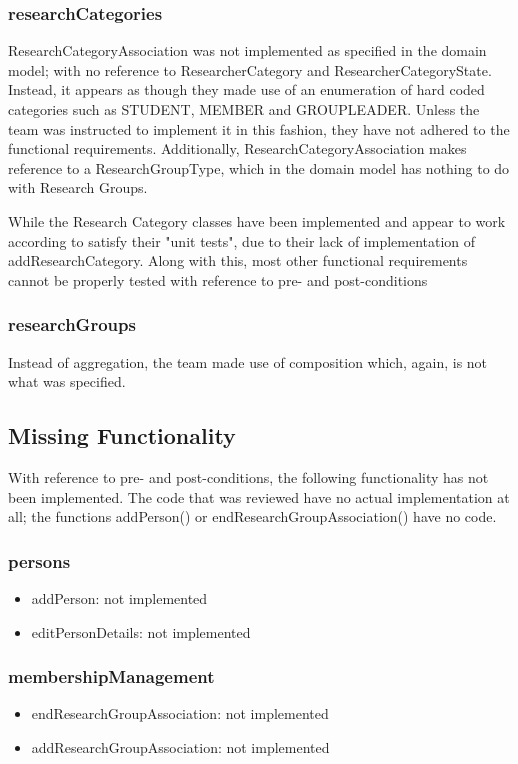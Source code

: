 \documentclass{article}
\begin{document}
	\subsubsection{researchCategories}
	ResearchCategoryAssociation was not implemented as specified in the domain model; with no reference to ResearcherCategory and ResearcherCategoryState. Instead, it appears as though they made use of an enumeration of hard coded categories such as STUDENT, MEMBER and GROUPLEADER. Unless the team was instructed to implement it in this fashion, they have not adhered to the functional requirements. Additionally, ResearchCategoryAssociation makes reference to a ResearchGroupType, which in the domain model has nothing to do with Research Groups.
	
	While the Research Category classes have been implemented and appear to work according to satisfy their "unit tests", due to their lack of implementation of addResearchCategory. Along with this, most other functional requirements cannot be properly tested with reference to pre- and post-conditions
	
	\subsubsection{researchGroups}
	
	Instead of aggregation, the team made use of composition which, again, is not what was specified.
	\newpage
	
	\subsection{Missing Functionality}
	
	With reference to pre- and post-conditions, the following functionality has not been implemented. The code that was reviewed have no actual implementation at all; the functions addPerson() or endResearchGroupAssociation() have no code.
	
	\subsubsection{persons} 
	\begin{itemize}
		\item addPerson: not implemented
		\item editPersonDetails: not implemented
	\end{itemize}
	
	\subsubsection{membershipManagement}
	\begin{itemize}
		\item endResearchGroupAssociation: not implemented
		\item addResearchGroupAssociation: not implemented
	\end{itemize}
	
\end{document}
